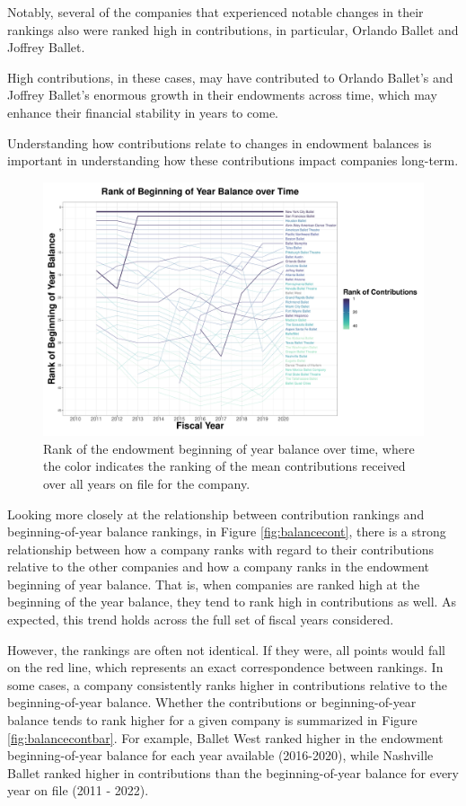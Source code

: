 \documentclass[Dance Data
Project,article,submit,moreauthors,pdftex]{mdpi}
\begin{document}
Notably, several of the companies that experienced notable changes in
their rankings also were ranked high in contributions, in particular,
Orlando Ballet and Joffrey Ballet.

High contributions, in these cases, may have contributed to Orlando
Ballet's and Joffrey Ballet's enormous growth in their endowments across
time, which may enhance their financial stability in years to come.

Understanding how contributions relate to changes in endowment balances
is important in understanding how these contributions impact companies
long-term.

\begin{figure}[H]
\includegraphics[width=0.9\linewidth,]{../images/rank-endowments-color-contribution} \caption{\label{fig:rank-endowments-color-contribution}Rank of the endowment beginning of year balance over time, where the color indicates the ranking of the mean contributions received over all years on file for the company.}\label{fig:unnamed-chunk-4}
\end{figure}

Looking more closely at the relationship between contribution rankings
and beginning-of-year balance rankings, in Figure \ref{fig:balancecont},
there is a strong relationship between how a company ranks with regard
to their contributions relative to the other companies and how a company
ranks in the endowment beginning of year balance. That is, when
companies are ranked high at the beginning of the year balance, they
tend to rank high in contributions as well. As expected, this trend
holds across the full set of fiscal years considered.

However, the rankings are often not identical. If they were, all points
would fall on the red line, which represents an exact correspondence
between rankings. In some cases, a company consistently ranks higher in
contributions relative to the beginning-of-year balance. Whether the
contributions or beginning-of-year balance tends to rank higher for a
given company is summarized in Figure \ref{fig:balancecontbar}. For
example, Ballet West ranked higher in the endowment beginning-of-year
balance for each year available (2016-2020), while Nashville Ballet
ranked higher in contributions than the beginning-of-year balance for
every year on file (2011 - 2022).
\end{document}
